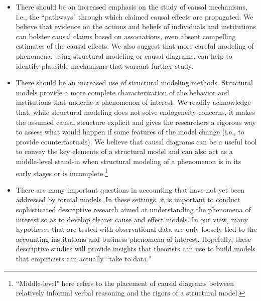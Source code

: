 \documentclass[12pt,reqno,titlepage]{amsart}
\begin{document}
\begin{doublespace}
\vskip -10pt
\begin{itemize}
\item There should be an increased emphasis on the study of causal mechanisms, i.e., the ``pathways" through which claimed causal effects are propagated.
We believe that evidence on the actions and beliefs of individuals and institutions can bolster causal claims based on associations, even absent compelling estimates of the causal effects.
We also suggest that more careful modeling of phenomena, using structural modeling or causal diagrams, can help to identify plausible mechanisms that warrant further study.
\item There should be an increased use of structural modeling methods. 
Structural models provide a more complete characterization of the behavior and institutions that underlie a phenomenon of interest.
We readily acknowledge that, while structural modeling does not solve endogeneity concerns, it makes the assumed causal structure explicit and gives the researchers a rigorous way to assess what would happen if some features of the model change (i.e., to provide counterfactuals).
We believe that causal diagrams can be a useful tool to convey the key elements of a structural model and can also act as a middle-level stand-in when structural modeling of a phenomenon is in its early stages or is incomplete.\footnote{``Middle-level" here refers to the placement of causal diagrams between relatively informal verbal reasoning and the rigors of a structural model.}
\item There are many important questions in accounting that have not yet been addressed by formal models.  In these settings, it is important to conduct sophisticated descriptive research aimed at understanding the phenomena of interest so as to develop clearer cause and effect models. In our view, many hypotheses that are tested with observational data are only loosely tied to the accounting institutions and business phenomena of interest. Hopefully, these descriptive studies will provide insights that theorists can use to build models that empiricists can actually ``take to data."
\end{itemize}


\end{doublespace}
\end{document}

